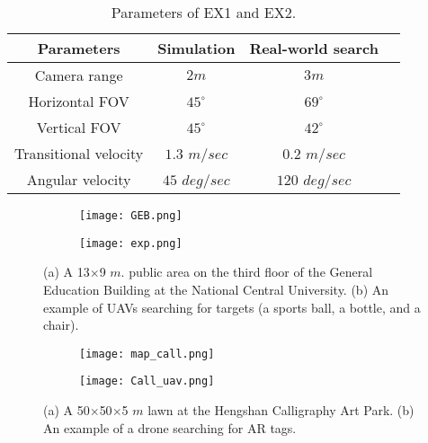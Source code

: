 \renewcommand{\arraystretch}{1.3}
\begin{table}[h]
\caption{Parameters of EX1 and EX2.}
\begin{center}
\begin{tabular}{|c||c|c|c|}
\hline
Parameters & Simulation & Real-world search \\
\hline\hline
Camera range & $2m$ & $3m$  \\
\hline
Horizontal FOV & $45^{\circ}$ & $69^{\circ}$  \\
\hline
Vertical FOV & $45^{\circ}$ & $42^{\circ}$ \\
\hline
Transitional velocity & $1.3$ $m/sec$ & $0.2$ $m/sec$ \\
\hline
Angular velocity & $45$ $deg/sec$ & $120$ $deg/sec$ \\
\hline
\end{tabular}
\label{Tab:parameters}
\end{center}
\end{table}


\begin{figure}
    \centering
    \begin{subfigure}[b]{0.5\textwidth}
        \texttt{[image: GEB.png]}
        \caption{} \label{GEB map}
    \end{subfigure}
    \begin{subfigure}[b]{0.5\textwidth}
    \centering
        \texttt{[image: exp.png]}
        \caption{} \label{GEB exp}
    \end{subfigure}
    \hfill
    \caption{(a) A 13$\times$9 $m.$ public area on the third floor of the General Education Building at the National Central University. (b) An example of UAVs searching for targets (a sports ball, a bottle, and a chair).
    }
    \label{GEB_fig}
\end{figure}

\begin{figure}
  \centering
  \begin{subfigure}[b]{0.21\textwidth}
      \texttt{[image: map\_call.png]}
      \caption{} \label{Call map}
  \end{subfigure}
  \begin{subfigure}[b]{0.26\textwidth}
  \centering
      \texttt{[image: Call\_uav.png]}
      \caption{} \label{Call exp}
  \end{subfigure}
  \hfill
  \caption{(a) A 50$\times$50$\times$5 $m$ lawn at the Hengshan Calligraphy Art Park. (b) An example of a drone searching for AR tags.
  }
  \label{Call_fig}
\end{figure}

